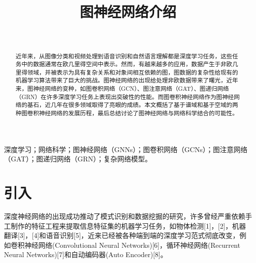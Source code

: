 \documentclass[10pt,journal,compsoc]{IEEEtran}
\begin{document}
	\title{图神经网络介绍}
	
	\author{\\
		}
	
	\maketitle
	
	\begin{abstract}
		近年来，从图像分类和视频处理到语音识别和自然语言理解都是深度学习任务，这些任务中的数据通常在欧几里得空间中表示。然而，有越来越多的应用，数据产生于非欧几里得领域，并被表示为具有复杂关系和对象间相互依赖的图，图数据的复杂性给现有的机器学习算法带来了巨大的挑战。图神经网络的出现给处理非欧数据带来了曙光，近年来，图神经网络的变种，如图卷积网络（GCN）、图注意网络（GAT）、图递归网络（GRN）在许多深度学习任务上表现出突破性的性能。而图卷积神经网络作为图神经网络的基石，近几年在很多领域取得了亮眼的成绩。本文概括了基于谱域和基于空域的两种图卷积神经网络的发展历程，最后总结讨论了图神经网络与网络科学结合的可能性。
	\end{abstract}
	
	\begin{IEEEkeywords}
		深度学习；网络科学；图神经网络（GNNs）；图卷积网络（GCNs）；图注意网络（GAT）；图递归网络（GRN）；复杂网络模型。
	\end{IEEEkeywords}
\IEEEpeerreviewmaketitle
\section{引入}

深度神经网络的出现成功推动了模式识别和数据挖掘的研究，许多曾经严重依赖手工制作的特征工程来提取信息特征集的机器学习任务，如物体检测[1]，[2]，机器翻译[3]，[4]和语音识别[5]，近来已经被各种端到端的深度学习范式彻底改变，例如卷积神经网络(Convolutional Neural Networks)[6]，循环神经网络(Recurrent Neural Networks)[7]和自动编码器(Auto Encoder)[8]。
\end{document}

